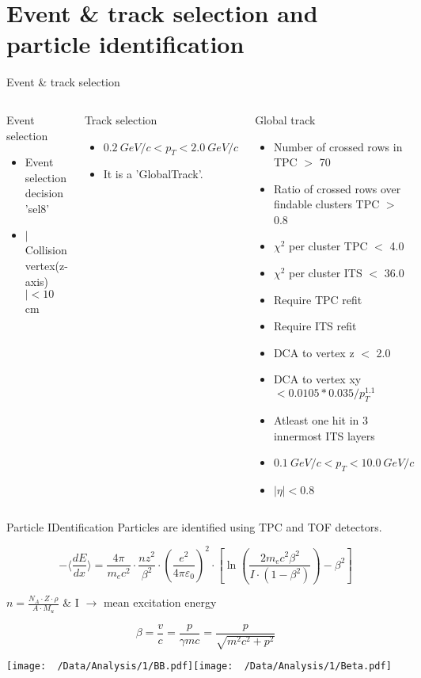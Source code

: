 \documentclass{beamer}
\begin{document}
\section{Event \& track selection and particle identification}
\begin{frame}{Event \& track selection}
	\begin{columns}
	\begin{block}{Event selection}
		\begin{itemize}
			\item Event selection decision 'sel8'
			\item $|$Collision vertex(z-axis)$| < 10$cm
		\end{itemize}
	\end{block}
	\begin{block}{Track selection}
	\begin{itemize}
		\item $0.2\ GeV/c<p_T<2.0\ GeV/c$
		\item It is a 'GlobalTrack'.
	\end{itemize}
	\end{block}
	\begin{block}{Global track}
		\tiny
		\begin{itemize}
			\item Number of crossed rows in TPC $>$ 70
			\item Ratio of crossed rows over findable clusters TPC $>$ 0.8
			\item $\chi^2$ per cluster TPC $<$ 4.0
			\item $\chi^2$ per cluster ITS $<$ 36.0
			\item Require TPC refit
			\item Require ITS refit
			\item DCA to vertex z $<$ 2.0
			\item DCA to vertex xy  $<0.0105*0.035/p_T^{1.1}$
			\item Atleast one hit in 3 innermost ITS layers
			\item $0.1\ GeV/c<p_T<10.0\ GeV/c$
			\item $|\eta|<0.8$
		\end{itemize}
	\end{block}
	\end{columns}
\end{frame}
\begin{frame}{Particle IDentification}
	Particles are identified using TPC and TOF detectors. 
	{\scriptsize
	\[-\langle\frac{dE}{dx}\rangle=\frac{4\pi}{m_{e}c^2}\cdot\frac{nz^2}{\beta^2}\cdot(\frac{e^2}{4\pi\varepsilon_0})^2\cdot[\ln(\frac{2m_ec^2\beta^2}{I\cdot(1-\beta^2)})-\beta^2]\]
	\begin{flushright}\tiny
		$n=\frac{N_A\cdot Z\cdot\rho}{A\cdot M_u}$ \& I $\to$ mean excitation energy
	\end{flushright}
	\[\beta=\frac{v}{c}=\frac{p}{\gamma mc}=\frac{p}{\sqrt{m^2c^2+p^2}}\]}
	\texttt{[image: ~/Data/Analysis/1/BB.pdf]}\texttt{[image: ~/Data/Analysis/1/Beta.pdf]}
\end{frame}
\end{document}
